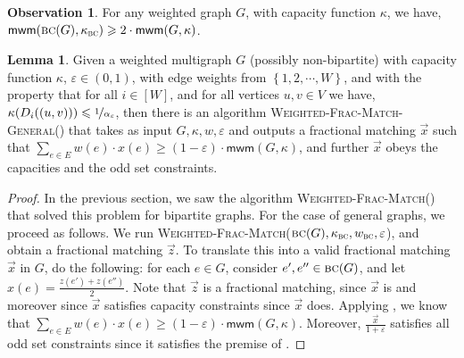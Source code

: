 \documentclass[a4paper,11pt]{article}
\newcommand{\set}[1]{\ensuremath{\left\{ #1 \right\}}}
\newcommand{\eps}{\varepsilon}
\theoremstyle{definition}
\theoremstyle{definition}
\theoremstyle{definition}
\theoremstyle{definition}
\theoremstyle{definition}
\newtheorem{lemma2}[definition2]{Lemma}
\theoremstyle{definition}
\theoremstyle{definition}
\newtheorem{observation2}[definition2]{Observation}
\theoremstyle{definition}
\theoremstyle{definition}
\theoremstyle{definition}
\theoremstyle{definition}
\theoremstyle{definition}
\theoremstyle{definition}
\theoremstyle{definition}
\theoremstyle{definition}
\begin{document}
\begin{observation2}\label{lem:matchingbc}
For any weighted graph $G$, with capacity function $\kappa$, we have, $\textsf{mwm}(\textsc{bc}(G),\kappa_{\textsc{bc}})\geqslant 2\cdot \textsf{mwm}(G,\kappa)$.
\end{observation2}

 
 \begin{lemma2}\label{lem:Hungarian}
 Given a weighted multigraph $G$ (possibly non-bipartite) with capacity function $\kappa$, $\eps\in (0,1)$, with edge weights from $\set{1,2,\cdots, W}$, and with the property that for all $i\in [W]$, and for all vertices $u,v\in V$ we have, $\kappa(D_{i}((u,v)))\leqslant \nicefrac{1}{\alpha_{\eps}}$, then there is an algorithm \textsc{Weighted-Frac-Match-General}() that takes as input $G, \kappa, w,\eps$ and outputs a fractional matching $\vec{x}$ such that $\sum_{e\in E}w(e)\cdot x(e)\geqslant (1-\eps)\cdot \textsf{mwm}(G,\kappa)$, and further $\vec{x}$ obeys the capacities and the odd set constraints. 
 \end{lemma2}
 \begin{proof}
     In the previous section, we saw the algorithm \textsc{Weighted-Frac-Match}() that solved this problem for bipartite graphs. For the case of general graphs, we proceed as follows. We run \textsc{Weighted-Frac-Match}($\textsc{bc}(G),\kappa_{\textsc{bc}},w_{\textsc{bc}},\eps$), and obtain a fractional matching $\vec{z}$. To translate this into a valid fractional matching $\vec{x}$ in $G$, do the following: for each $e\in G$, consider $e',e''\in \textsc{bc}(G)$, and let $x(e)=\frac{z(e')+z(e'')}{2}$. Note that $\vec{z}$ is a fractional matching, since $\vec{x}$ is and moreover since $\vec{x}$ satisfies capacity constraints since $\vec{x}$ does. Applying , we know that $\sum_{e\in E}w(e)\cdot x(e)\geqslant (1-\eps)\cdot \textsf{mwm}(G,\kappa)$. Moreover, $\frac{\vec{x}}{1+\eps}$ satisfies all odd set constraints since it satisfies the premise of .
 \end{proof}
 
\end{document}
